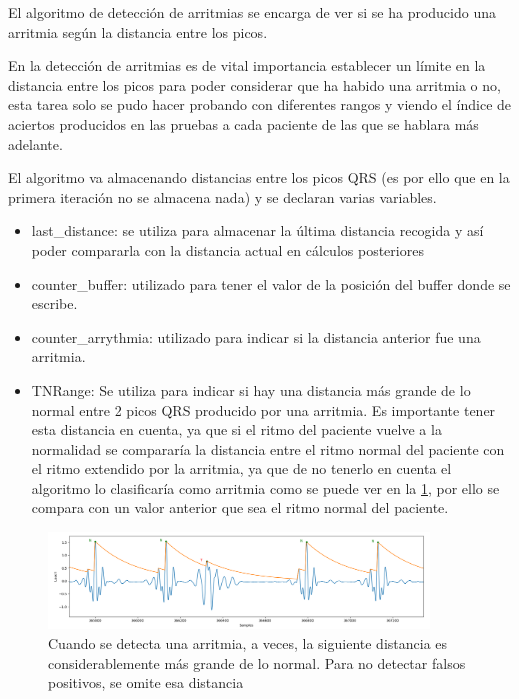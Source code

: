 El algoritmo de detección de arritmias se encarga de ver si se ha producido una arritmia según la
distancia entre los picos.

En la detección de arritmias es de vital importancia establecer un límite en la distancia entre los picos
para poder considerar que ha habido una arritmia o no, esta tarea solo se pudo hacer probando con diferentes
rangos y viendo el índice de aciertos producidos en las pruebas a cada paciente de las que se hablara más adelante. 

El algoritmo va almacenando distancias entre los picos QRS (es por ello que en la primera iteración no se almacena nada)
y se declaran varias variables.

\begin{itemize}
    \item last\_distance: se utiliza para almacenar la última distancia recogida y así poder compararla con la distancia 
    actual en cálculos posteriores
    \item counter\_buffer: utilizado para tener el valor de la posición del buffer donde se escribe.
    \item counter\_arrythmia: utilizado para indicar si la distancia anterior fue una arritmia.
    \item TNRange: Se utiliza para indicar si hay una distancia más grande de lo normal entre 2 picos QRS producido
    por una arritmia. Es importante tener esta distancia en cuenta, ya que si el ritmo del paciente vuelve a la
    normalidad se compararía la distancia entre el ritmo normal del paciente con el ritmo extendido por la arritmia,
    ya que de no tenerlo en cuenta el algoritmo lo clasificaría como arritmia como se puede ver en la \cref{fig:senial_explicacion_TNRANGE}, por ello se compara con un valor anterior
    que sea el ritmo normal del paciente.
\end{itemize}

\begin{figure}[h!]
    \centering
    \includegraphics[width=0.9\textwidth]{./Images/img_algoritmo/senial_explicacion_TNRANGE.png}
    \caption{Cuando se detecta una arritmia, a veces, la siguiente distancia es considerablemente más grande de lo normal. Para no detectar falsos positivos, se omite esa distancia}
    \label{fig:senial_explicacion_TNRANGE}
\end{figure}


